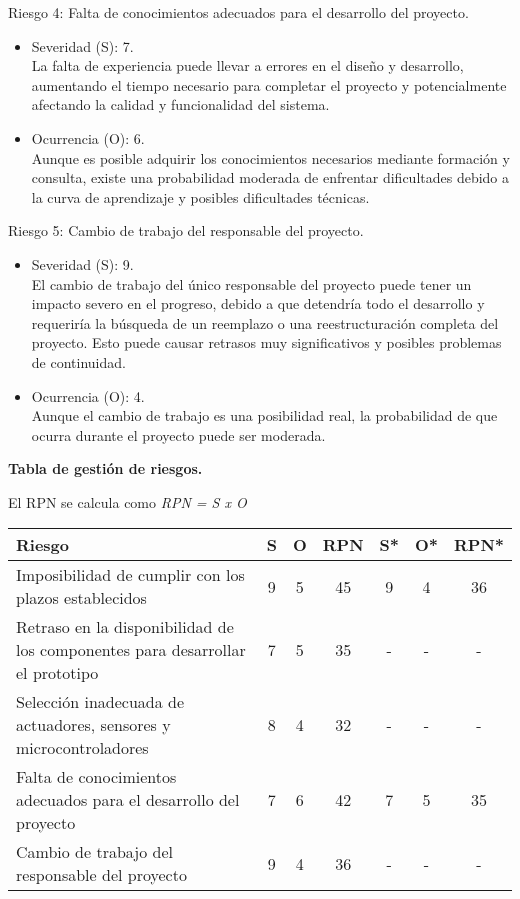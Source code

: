 Riesgo 4: Falta de conocimientos adecuados para el desarrollo del proyecto.
\begin{itemize}
	\item Severidad (S): 7.\\ La falta de experiencia puede llevar a errores en el diseño
	      y desarrollo, aumentando el tiempo necesario para completar el proyecto y
	      potencialmente afectando la calidad y funcionalidad del sistema.
	\item Ocurrencia (O): 6.\\ Aunque es posible adquirir los conocimientos necesarios
	      mediante formación y consulta, existe una probabilidad moderada de enfrentar
	      dificultades debido a la curva de aprendizaje y posibles dificultades técnicas.
\end{itemize}

Riesgo 5: Cambio de trabajo del responsable del proyecto.
\begin{itemize}
	\item Severidad (S): 9.\\ El cambio de trabajo del único responsable del proyecto
	      puede tener un impacto severo en el progreso, debido a que detendría todo el
	      desarrollo y requeriría la búsqueda de un reemplazo o una reestructuración
	      completa del proyecto. Esto puede causar retrasos muy significativos y posibles
	      problemas de continuidad.
	\item Ocurrencia (O): 4.\\ Aunque el cambio de trabajo es una posibilidad real, la
	      probabilidad de que ocurra durante el proyecto puede ser moderada.
\end{itemize}

\pagebreak

\textbf{Tabla de gestión de riesgos.}

El RPN se calcula como \textit{RPN = S x O}

\begin{table}[H]
	\centering
	\begin{tabularx}{\linewidth}{@{}|X|c|c|c|c|c|c|@{}}
		\hline
		\rowcolor[HTML]{C0C0C0}
		Riesgo                                               & S & O & RPN & S* & O* & RPN* \\ \hline
		Imposibilidad de cumplir con los plazos establecidos & 9 & 5 & 45  & 9  & 4  & 36   \\ \hline
		Retraso en la disponibilidad de los componentes para
		desarrollar el prototipo                             & 7 & 5 & 35  & -  & -  & -    \\ \hline
		Selección inadecuada de actuadores, sensores y
		microcontroladores                                   & 8 & 4 & 32  & -  & -  & -    \\ \hline
		Falta de conocimientos adecuados para el desarrollo del
		proyecto                                             & 7 & 6 & 42  & 7  & 5  & 35   \\ \hline
		Cambio de trabajo del responsable del proyecto       & 9 & 4 & 36  & -  & -  & -    \\ \hline
	\end{tabularx}%
\end{table}

